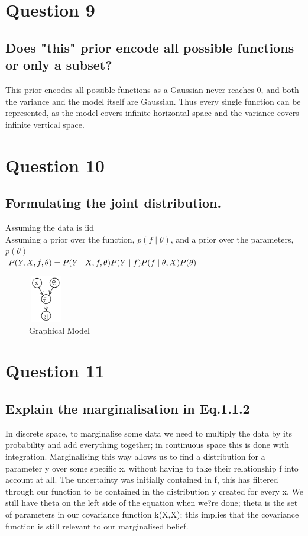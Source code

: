 \documentclass[a4paper, 9pt]{article}
\begin{document}
\section*{Question 9}
\subsection*{Does "this" prior encode all possible functions or only a subset?}
This prior encodes all possible functions as a Gaussian never reaches 0, and both the variance and the model itself are Gaussian. Thus every single function can be represented, as the model covers infinite horizontal space and the variance covers infinite vertical space.

\section*{Question 10}
\subsection*{Formulating the joint distribution.}
Assuming the data is iid \\
\newline
Assuming a prior over the function, \( p (f \mid \theta) \), and a prior over the parameters, \(p(\theta ) \) \\
\newline
\( P(Y, X, f, \theta) = P(Y \mid X, f, \theta) \\
\newline
P(Y \mid f)P(f \mid \theta, X)P( \theta) \)\\
\begin{figure}[h]
\begin{center}
\includegraphics[width=0.6in,height=0.8in]{path} 
\end{center}
\caption{Graphical Model}
\end{figure}

\section*{Question 11}
\subsection*{Explain the marginalisation in Eq.1.1.2}
In discrete space, to marginalise some data we need to multiply the data by its probability and add everything together; in continuous space this is done with integration. Marginalising this way allows us to find a distribution for a parameter y over some specific x, without having to take their relationship f into account at all. The uncertainty was initially contained in f, this has filtered through our function to be contained in the distribution y created for every x. We still have theta on the left side of the equation when we?re done; theta is the set of parameters in our covariance function k(X,X); this implies that the covariance function is still relevant to our marginalised belief.
\end{document}
